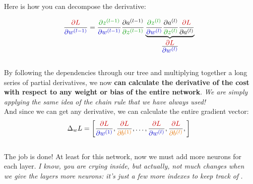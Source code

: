 \begin{minipage}{0.55\textwidth}

Here is how you can decompose the derivative:

\vspace{-0.3cm}
$$\frac{\textcolor{myred}{\partial L}}{\textcolor{myblue}{\partial w^{(l-1)}}} = 
\frac{\textcolor{mygreen}{\partial z^{(l-1)}}}{\textcolor{myblue}{\partial w^{(l-1)}}}  
\frac{\partial a^{(l-1)}}{\textcolor{mygreen}{\partial z^{(l-1)}}} 
\underbrace{
\frac{\textcolor{mygreen}{\partial z^{(l)}}}{\textcolor{myblue}{\partial w^{(l)}}}  
\frac{\partial a^{(l)}}{\textcolor{mygreen}{\partial z^{(l)}}} 
\frac{\textcolor{myred}{\partial L}}{\partial a^{(l)}}}_\textrm{\Large$\frac{\textcolor{myred}{\partial L}}{\textcolor{myblue}{\partial w^{(l)}}}$}$$
\vspace{-0.3cm}
\ \\
By following the dependencies through our tree and multiplying together a long series of partial derivatives, we now \textbf{can calculate the derivative of the cost with respect to any weight or bias of the entire network}. \textit{We are simply applying the same idea of the chain rule that we have always used!} \\

And since we can get any derivative, we can calculate the entire gradient vector:
\vspace{-0.1cm}
$$
\Delta_w L = \left[ \frac{\textcolor{myred}{\partial L}}{\textcolor{myblue}{\partial w^{(1)}}}, \frac{\textcolor{myred}{\partial L}}{\textcolor{myorange}{\partial b^{(1)}}}, \ldots , \frac{\textcolor{myred}{\partial L}}{\textcolor{myblue}{\partial w^{(l)}}}, \frac{\textcolor{myred}{\partial L}}{\textcolor{myorange}{\partial b^{(l)}}},\right] 
$$
\vspace{-0.3cm}
\ \\
The job is done! At least for this network, now we must add more neurons for each layer. \textit{I know, you are crying inside, but actually, not much changes when we give the layers more neurons: it's just a few more indexes to keep track of }.

\vspace{1cm}

\end{minipage}
